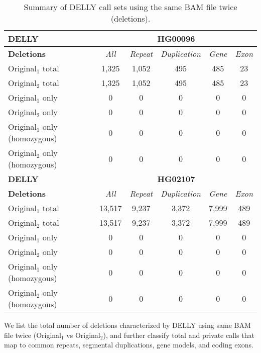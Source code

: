 \begin{table}[htb]
\caption{ Summary of DELLY call sets using the same BAM file twice (deletions). }
\begin{center}
\begin{tabular}{|l|c||c|c|c|c|}
\hline
{\bf DELLY} & \multicolumn{5}{|c|}{\bf HG00096} \\
\hline
\cline{2-6}
{\bf Deletions} & {\it All} & {\it Repeat} & {\it Duplication} & {\it Gene} & {\it Exon} \\
\hline
Original$_1$ total & 1,325 & 1,052 & 495 & 485 & 23\\ 
\hline
Original$_2$ total & 1,325 & 1,052 & 495 & 485 & 23\\ 
\hline
Original$_1$ only & 0 & 0 & 0 & 0 & 0\\ 
\hline
Original$_2$ only & 0 & 0 & 0 & 0 & 0\\ 
\hline
Original$_1$ only (homozygous) & 0 & 0 & 0 & 0 & 0\\ 
\hline
Original$_2$ only (homozygous) & 0 & 0 & 0 & 0 & 0\\ 
\hline
\hline
{\bf DELLY} & \multicolumn{5}{|c|}{\bf HG02107} \\
\hline
\cline{2-6}
{\bf Deletions} & {\it All} & {\it Repeat} & {\it Duplication} & {\it Gene} & {\it Exon} \\
\hline
Original$_1$ total & 13,517 & 9,237 & 3,372 & 7,999 & 489\\ 
\hline
Original$_2$ total & 13,517 & 9,237 & 3,372 & 7,999 & 489\\ 
\hline
Original$_1$ only & 0 & 0 & 0 & 0 & 0\\ 
\hline
Original$_2$ only & 0 & 0 & 0 & 0 & 0\\ 
\hline
Original$_1$ only (homozygous) & 0 & 0 & 0 & 0 & 0\\ 
\hline
Original$_2$ only (homozygous) & 0 & 0 & 0 & 0 & 0\\ 
\hline
\end{tabular}
\end{center}
{\footnotesize We list the total number of deletions characterized by DELLY using same BAM file twice (Original$_1$ vs Original$_2$), 
and further classify total and private calls that map to common repeats, segmental duplications, gene models, and coding exons.}
\label{supptab:orig-vs-orig2-delly-deletions}
\end{table}


